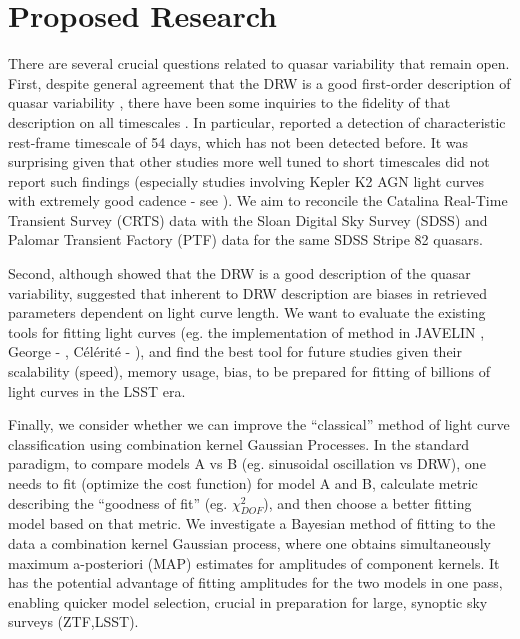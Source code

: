 \documentclass[modern]{aastex62}
\begin{document}
\section{Proposed Research}

There are several crucial questions related to quasar variability that remain open. First, despite general agreement that the DRW is a good first-order description of quasar variability \citep{zu2011,kozlowski2010}, there have been some inquiries to the fidelity of that description on all timescales \citep{zu2013, kasliwal2017, sartori2018}. In particular, \cite{graham2014} reported  a detection of characteristic rest-frame timescale of 54 days, which has not been detected before. It was surprising given that other studies more well tuned to short timescales did not report such findings (especially studies involving Kepler K2  AGN light curves with extremely good cadence - see \citealt{kasliwal2015a, aranzana2018, smith2018}). We aim to reconcile the Catalina Real-Time Transient Survey (CRTS) data with the Sloan Digital Sky Survey (SDSS) and Palomar Transient Factory (PTF) data for the same SDSS Stripe 82 quasars. 

Second, although \cite{kelly2011} showed that the DRW is a good description of the quasar variability, \cite{kozlowski2017a} suggested that inherent to DRW description are biases in retrieved parameters dependent on light curve length. We want to evaluate the existing tools for fitting light curves (eg. the implementation of \citealt{rybicki1995} method in JAVELIN \citealt{zu2011}, George - \citealt{ambikasaran2015}, C\'el\'erit\'e - \citealt{foreman2017}), and find the best tool for future studies given their scalability (speed), memory usage, bias, to be prepared for fitting of billions of light curves in the LSST era. 

Finally, we consider whether we can improve the ``classical'' method of light curve classification using combination kernel Gaussian Processes. In the standard paradigm,  to compare models A vs B (eg. sinusoidal oscillation vs DRW), one needs to fit (optimize the cost function) for model A and B,  calculate metric describing the ``goodness of fit'' (eg. $\chi^{2}_{DOF}$), and then choose a better fitting model based on that metric. We investigate a Bayesian method of fitting to the data a combination kernel Gaussian process, where one obtains simultaneously maximum a-posteriori (MAP) estimates for amplitudes of component kernels. It has the potential advantage of fitting amplitudes for the two models in one pass, enabling quicker model selection, crucial in preparation for large, synoptic sky surveys (ZTF,LSST).
\end{document}
